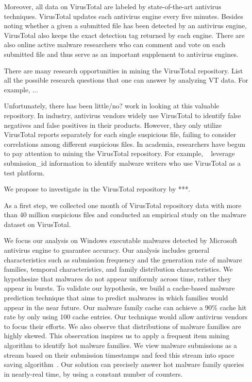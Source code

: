 Moreover, all data on VirusTotal are labeled by state-of-the-art antivirus techniques. 
VirusTotal updates each antivirus engine every five minutes. 
Besides noting whether a given a submitted file has been detected by an antivirus engine, 
VirusTotal also keeps the exact detection tag returned by each engine. 
There are also online active malware researchers 
who can comment and vote on each submitted file 
and thus serve as an important supplement to antivirus engines. 

There are many research opportunities in mining the VirusTotal repository. 
List all the possible research questions that one can answer by analyzing VT data.
For example, ...

Unfortunately, there has been little/no? work in looking at this valuable repository.
In industry, antivirus vendors widely use VirusTotal to identify false negatives 
and false positives in their products. 
However, they only utilize VirusTotal reports separately for each single suspicious file, 
failing to consider correlations among different suspicious files. 
In academia, researchers have begun to pay attention to mining the VirusTotal repository. 
For example, ~\citet{neeles} leverage submission\_id information to identify malware writers 
who use VirusTotal as a test platform. 

We propose to investigate in the VirusTotal repository by ***.

As a first step, we collected one month of VirusTotal repository data with more than 40 million suspicious files
and conducted an empirical study on the malware dataset on VirusTotal. 

We focus our analysis on Windows executable malwares detected by Microsoft
antivirus engine to guarantee accuracy. 
Our analysis includes general characteristics such as submission frequency and the generation rate of malware families, 
temporal characteristics, and family distribution characteristics. 
We hypothesize that malwares do not appear uniformly across time, rather they appear in bursts. 
To validate our hypothesis, we build a cache-based malware prediction technique that aims to predict malwares in which families would appear in the near future. 
Our malware family cache can achieve a 90\% cache hit rate by only using 100 cache entries.
Our technique would allow antivirus vendors to focus their efforts. 
We also observe that distributions of malware families are highly skewed. 
This observation inspires us to apply a frequent item mining algorithm to 
identify hot malware families. 
We view malware submissions as a stream based on their submission timestamps and 
feed this stream into space saving algorithm~\cite{space-saving}. 
Our solution can precisely answer hot malware family queries in nearly-real time, by using a constant number of counters.  


